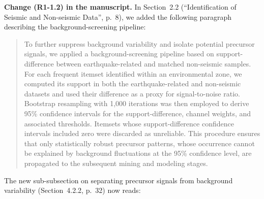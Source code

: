\documentclass[12pt]{article}
\newcommand{\revchange}[1]{\begingroup\color{changecolor}#1\endgroup}
\begin{document}
\revchange{%
\textbf{Change (R1-1.2) in the manuscript.}
In Section~2.2 (``Identification of Seismic and Non-seismic Data'', p.~8), we added the following paragraph describing the background-screening pipeline:

\begin{quote}
To further suppress background variability and isolate potential precursor signals, we applied a background-screening pipeline based on support-difference between earthquake-related and matched non-seismic samples. For each frequent itemset identified within an environmental zone, we computed its support in both the earthquake-related and non-seismic datasets and used their difference as a proxy for signal-to-noise ratio. Bootstrap resampling with 1,000 iterations was then employed to derive 95\% confidence intervals for the support-difference, channel weights, and associated thresholds. Itemsets whose support-difference confidence intervals included zero were discarded as unreliable. This procedure ensures that only statistically robust precursor patterns, whose occurrence cannot be explained by background fluctuations at the 95\% confidence level, are propagated to the subsequent mining and modeling stages.
	\end{quote}
	
	The new sub-subsection on separating precursor signals from background variability (Section~4.2.2, p.~32) now reads:

}
\end{document}

